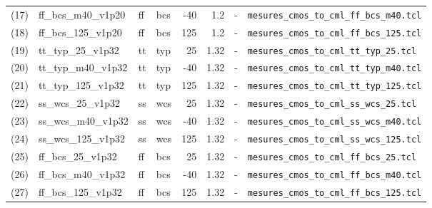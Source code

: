 \documentclass[a4paper,10pt,landscape]{article}
\begin{document}
\begin{longtable}{rlllrrrl}
(17) & ff\_bcs\_m40\_v1p20 & ff & bcs & -40 & 1.2 & - & {\small\texttt{mesures\_cmos\_to\_cml\_ff\_bcs\_m40.tcl}} \\
(18) & ff\_bcs\_125\_v1p20 & ff & bcs & 125 & 1.2 & - & {\small\texttt{mesures\_cmos\_to\_cml\_ff\_bcs\_125.tcl}} \\
(19) & tt\_typ\_25\_v1p32 & tt & typ & 25 & 1.32 & - & {\small\texttt{mesures\_cmos\_to\_cml\_tt\_typ\_25.tcl}} \\
(20) & tt\_typ\_m40\_v1p32 & tt & typ & -40 & 1.32 & - & {\small\texttt{mesures\_cmos\_to\_cml\_tt\_typ\_m40.tcl}} \\
(21) & tt\_typ\_125\_v1p32 & tt & typ & 125 & 1.32 & - & {\small\texttt{mesures\_cmos\_to\_cml\_tt\_typ\_125.tcl}} \\
(22) & ss\_wcs\_25\_v1p32 & ss & wcs & 25 & 1.32 & - & {\small\texttt{mesures\_cmos\_to\_cml\_ss\_wcs\_25.tcl}} \\
(23) & ss\_wcs\_m40\_v1p32 & ss & wcs & -40 & 1.32 & - & {\small\texttt{mesures\_cmos\_to\_cml\_ss\_wcs\_m40.tcl}} \\
(24) & ss\_wcs\_125\_v1p32 & ss & wcs & 125 & 1.32 & - & {\small\texttt{mesures\_cmos\_to\_cml\_ss\_wcs\_125.tcl}} \\
(25) & ff\_bcs\_25\_v1p32 & ff & bcs & 25 & 1.32 & - & {\small\texttt{mesures\_cmos\_to\_cml\_ff\_bcs\_25.tcl}} \\
(26) & ff\_bcs\_m40\_v1p32 & ff & bcs & -40 & 1.32 & - & {\small\texttt{mesures\_cmos\_to\_cml\_ff\_bcs\_m40.tcl}} \\
(27) & ff\_bcs\_125\_v1p32 & ff & bcs & 125 & 1.32 & - & {\small\texttt{mesures\_cmos\_to\_cml\_ff\_bcs\_125.tcl}} \\
\bottomrule\end{longtable}
\end{document}
